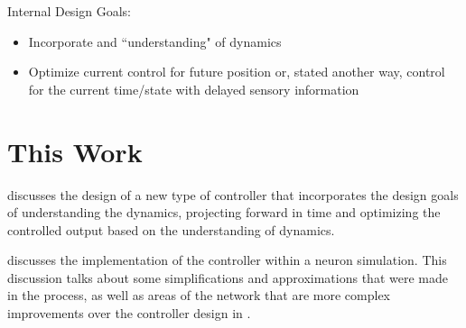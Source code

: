 Internal Design Goals:
\begin{itemize}
\item Incorporate and ``understanding" of dynamics
\item Optimize current control for future position or, stated another way,
control for the current time/state with delayed sensory information
\end{itemize}

\section{This Work}

 discusses the design of a new type 
of controller that incorporates the
design goals of understanding the dynamics, projecting forward in time and
optimizing the controlled output based on the understanding of dynamics.

 discusses the implementation of the controller within 
a neuron
simulation. This discussion talks about some simplifications and approximations
that were made in the process, as well as areas of the network that are more
complex improvements over the controller design in .

